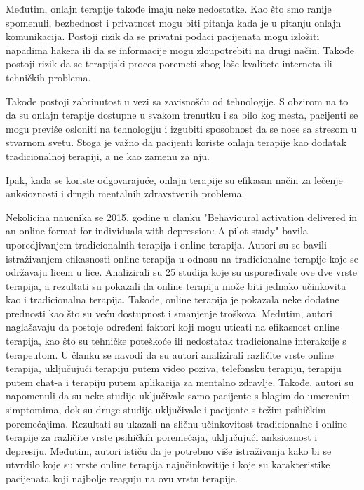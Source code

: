 \documentclass[a4paper]{article}
\begin{document}
Međutim, onlajn terapije takođe imaju neke nedostatke. Kao što smo ranije spomenuli, bezbednost i privatnost mogu biti pitanja kada je u pitanju onlajn komunikacija. Postoji rizik da se privatni podaci pacijenata mogu izložiti napadima hakera ili da se informacije mogu zloupotrebiti na drugi način. Takođe postoji rizik da se terapijski proces poremeti zbog loše kvalitete interneta ili tehničkih problema.

Takođe postoji zabrinutost u vezi sa zavisnošću od tehnologije. S obzirom na to da su onlajn terapije dostupne u svakom trenutku i sa bilo kog mesta, pacijenti se mogu previše osloniti na tehnologiju i izgubiti sposobnost da se nose sa stresom u stvarnom svetu. Stoga je važno da pacijenti koriste onlajn terapije kao dodatak tradicionalnoj terapiji, a ne kao zamenu za nju.

Ipak, kada se koriste odgovarajuće, onlajn terapije su efikasan način za lečenje anksioznosti i drugih mentalnih zdravstvenih problema.

Nekolicina naucnika se 2015. godine u clanku "Behavioural activation delivered in an online format for individuals with depression: A pilot study" bavila uporedjivanjem tradicionalnih terapija i online terapija. Autori su se bavili istraživanjem efikasnosti online terapija u odnosu na tradicionalne terapije koje se održavaju licem u lice. Analizirali su 25 studija koje su uspoređivale ove dve vrste terapija, a rezultati su pokazali da online terapija može biti jednako učinkovita kao i tradicionalna terapija. Takođe, online terapija je pokazala neke dodatne prednosti kao što su veću dostupnost i smanjenje troškova. Međutim, autori naglašavaju da postoje određeni faktori koji mogu uticati na efikasnost online terapija, kao što su tehničke poteškoće ili nedostatak tradicionalne interakcije s terapeutom. U članku se navodi da su autori analizirali različite vrste online terapija, uključujući terapiju putem video poziva, telefonsku terapiju, terapiju putem chat-a i terapiju putem aplikacija za mentalno zdravlje. Takođe, autori su napomenuli da su neke studije uključivale samo pacijente s blagim do umerenim simptomima, dok su druge studije uključivale i pacijente s težim psihičkim poremećajima. Rezultati su ukazali na sličnu učinkovitost tradicionalne i online terapije za različite vrste psihičkih poremećaja, uključujući anksioznost i depresiju. Međutim, autori ističu da je potrebno više istraživanja kako bi se utvrdilo koje su vrste online terapija najučinkovitije i koje su karakteristike pacijenata koji najbolje reaguju na ovu vrstu terapije.
\end{document}
